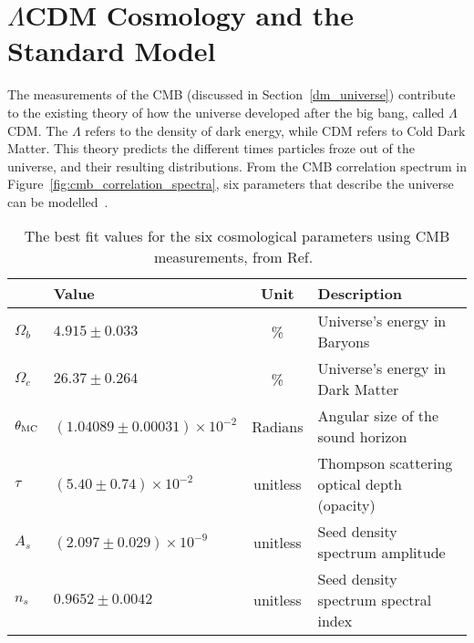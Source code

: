 \section{$\Lambda$CDM Cosmology and the Standard Model}

The measurements of the CMB (discussed in Section~\ref{dm_universe}) contribute to the existing theory of how the universe developed after the big bang, called $\Lambda$CDM.
The $\Lambda$ refers to the density of dark energy, while CDM refers to Cold Dark Matter.
This theory predicts the different times particles froze out of the universe, and their resulting distributions.
From the CMB correlation spectrum in Figure~\ref{fig:cmb_correlation_spectra}, six parameters that describe the universe can be modelled~\cite{planck_dm_limit,planck_2013_parameters}.

%   

\begin{table}[b]
  \centering
  \caption[6 Cosmological Parameters]{
    The best fit values for the six cosmological parameters using CMB measurements, from Ref.~\cite{planck_dm_limit}}
  \label{tab:six_params}
  \begin{tabular}{llcl}
               & \textbf{Value}                 & \textbf{Unit} & \textbf{Description} \\
    \hline 
    $\Omega_b$ & $ 4.915  \pm0.033                 $ & \%       & Universe's energy in Baryons \\
    $\Omega_c$ & $ 26.37  \pm0.264                 $ & \%       & Universe's energy in Dark Matter \\
    $\theta_{\textrm{MC}}$ & $(1.04089\pm0.00031)\times 10^{-2}$ & Radians  & Angular size of the sound horizon \\
    $\tau$     & $(5.40   \pm0.74   )\times 10^{-2}$ & unitless & Thompson scattering optical depth (opacity)\\
    $A_s$      & $(2.097  \pm0.029  )\times 10^{-9}$ & unitless & Seed density spectrum amplitude \\
    $n_s$      & $ 0.9652 \pm0.0042                $ & unitless & Seed density spectrum spectral index \\
    \hline 
  \end{tabular}
\end{table}

